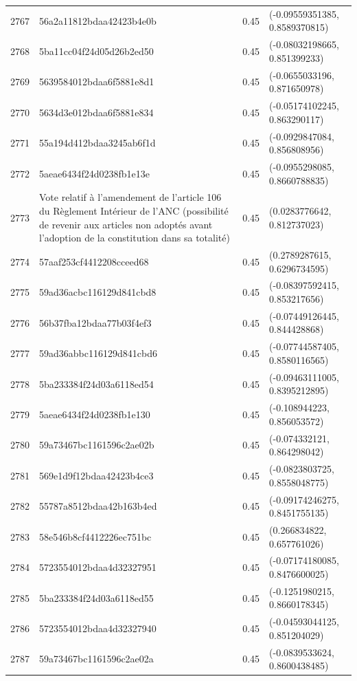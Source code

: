 \begin{table}[ht]
\begin{tabular}{rlrl}
  2767 & 56a2a11812bdaa42423b4e0b & 0.45 & (-0.09559351385, 0.8589370815) \\ 
  2768 & 5ba11cc04f24d05d26b2ed50 & 0.45 & (-0.08032198665, 0.851399233) \\ 
  2769 & 5639584012bdaa6f5881e8d1 & 0.45 & (-0.0655033196, 0.871650978) \\ 
  2770 & 5634d3e012bdaa6f5881e834 & 0.45 & (-0.05174102245, 0.863290117) \\ 
  2771 & 55a194d412bdaa3245ab6f1d & 0.45 & (-0.0929847084, 0.856808956) \\ 
  2772 & 5aeae6434f24d0238fb1e13e & 0.45 & (-0.0955298085, 0.8660788835) \\ 
  2773 & Vote relatif à l'amendement de l'article 106 du Règlement Intérieur de l'ANC (possibilité de revenir aux articles non adoptés avant l'adoption de la constitution dans sa totalité) & 0.45 & (0.0283776642, 0.812737023) \\ 
  2774 & 57aaf253cf4412208cceed68 & 0.45 & (0.2789287615, 0.6296734595) \\ 
  2775 & 59ad36acbc116129d841cbd8 & 0.45 & (-0.08397592415, 0.853217656) \\ 
  2776 & 56b37fba12bdaa77b03f4ef3 & 0.45 & (-0.07449126445, 0.844428868) \\ 
  2777 & 59ad36abbc116129d841cbd6 & 0.45 & (-0.07744587405, 0.8580116565) \\ 
  2778 & 5ba233384f24d03a6118ed54 & 0.45 & (-0.09463111005, 0.8395212895) \\ 
  2779 & 5aeae6434f24d0238fb1e130 & 0.45 & (-0.108944223, 0.856053572) \\ 
  2780 & 59a73467bc1161596c2ae02b & 0.45 & (-0.074332121, 0.864298042) \\ 
  2781 & 569e1d9f12bdaa42423b4ce3 & 0.45 & (-0.0823803725, 0.8558048775) \\ 
  2782 & 55787a8512bdaa42b163b4ed & 0.45 & (-0.09174246275, 0.8451755135) \\ 
  2783 & 58e546b8cf4412226ec751bc & 0.45 & (0.266834822, 0.657761026) \\ 
  2784 & 5723554012bdaa4d32327951 & 0.45 & (-0.07174180085, 0.8476600025) \\ 
  2785 & 5ba233384f24d03a6118ed55 & 0.45 & (-0.1251980215, 0.8660178345) \\ 
  2786 & 5723554012bdaa4d32327940 & 0.45 & (-0.04593044125, 0.851204029) \\ 
  2787 & 59a73467bc1161596c2ae02a & 0.45 & (-0.0839533624, 0.8600438485) \\ 

\end{tabular}
\end{table}
